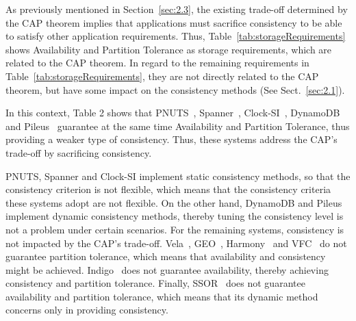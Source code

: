 {\rc 
As previously mentioned in Section~\ref{sec:2.3}, the existing trade-off determined by the CAP theorem implies that applications must sacrifice consistency to be able to satisfy other application requirements. Thus, Table~\ref{tab:storageRequirements} shows Availability and Partition Tolerance as storage requirements, which are related to the CAP theorem. In regard to the remaining requirements in Table~\ref{tab:storageRequirements}, they are not directly {\al related to} the CAP theorem, %
{\al but have} some impact on the consistency methods (See Sect.~\ref{sec:2.1}). 

In this context, Table 2 shows that PNUTS~\cite{cooper2008pnuts}, Spanner~\cite{Corbett:2013}, Clock-SI~\cite{Du2013}, DynamoDB~\cite{sivasubramanian2012amazon} and Pi\-leus~\cite{Terry:2013} guarantee at the same time Availability and Partition Tolerance, {\al thus providing a weaker type of consistency.}
Thus, these systems address the CAP's trade-off by sacrificing consistency. 

PNUTS, Spanner and Clock-SI implement static consistency methods, so that the consistency criterion is not flexible, which means that the consistency criteria these systems adopt are not flexible. 
On the other hand, DynamoDB and Pileus implement dynamic consistency methods, thereby tuning the consistency level is not a problem under certain scenarios. For the remaining systems, consistency is not impacted by the CAP's trade-off. Vela~\cite{salomie2015scaling}, GEO~\cite{BernsteinBBCFKK17}, Harmony~\cite{chihoub2012harmony} and VFC~\cite{esteves2012quality} do not guarantee partition tolerance, {\al which means that} availability and consistency {\al might} be achieved. Indigo~\cite{balegas2015putting} does not guarantee availability, thereby achieving consistency and partition tolerance. Finally, SSOR~\cite{Chen:2014} does not guarantee availability and partition tolerance, which means that its dynamic method %
{\al concerns} only in providing consistency.
}

